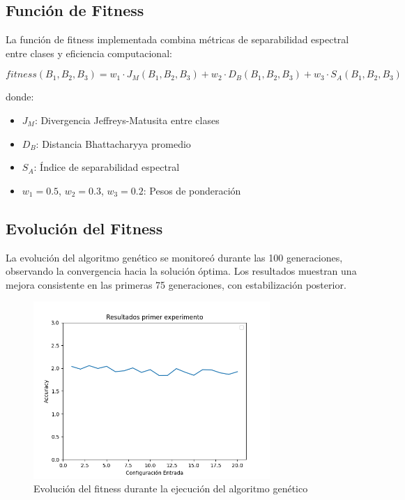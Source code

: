 \subsection{Función de Fitness}

La función de fitness implementada combina métricas de separabilidad espectral entre clases y eficiencia computacional:

\begin{equation}
fitness(B_1, B_2, B_3) = w_1 \cdot J_M(B_1, B_2, B_3) + w_2 \cdot D_B(B_1, B_2, B_3) + w_3 \cdot S_A(B_1, B_2, B_3)
\end{equation}

donde:
\begin{itemize}
    \item $J_M$: Divergencia Jeffreys-Matusita entre clases
    \item $D_B$: Distancia Bhattacharyya promedio
    \item $S_A$: Índice de separabilidad espectral
    \item $w_1 = 0.5$, $w_2 = 0.3$, $w_3 = 0.2$: Pesos de ponderación
\end{itemize}

\subsection{Evolución del Fitness}

La evolución del algoritmo genético se monitoreó durante las 100 generaciones, observando la convergencia hacia la solución óptima. Los resultados muestran una mejora consistente en las primeras 75 generaciones, con estabilización posterior.

\begin{figure}[h!]
\centering
\includegraphics[width=0.8\textwidth]{images/resultFirstEval.png}
\caption{Evolución del fitness durante la ejecución del algoritmo genético}
\label{fig:fitness_evolution}
\end{figure}


